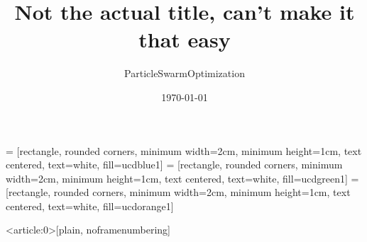 \documentclass[light]{ucdbeamer}
\institute[UC Davis]{University of California, Davis}
\author{ParticleSwarmOptimization}
\title{Not the actual title, can't make it that easy}
\date{\today}
\begin{document}

 = [rectangle, rounded corners, minimum width=2cm, minimum height=1cm, text centered, text=white, fill=ucdblue1]
 = [rectangle, rounded corners, minimum width=2cm, minimum height=1cm, text centered, text=white, fill=ucdgreen1]
 = [rectangle, rounded corners, minimum width=2cm, minimum height=1cm, text centered, text=white, fill=ucdorange1]

{
  \begin{frame}<article:0>[plain, noframenumbering]
  \end{frame}
}
    
{ %
}
\end{document}
